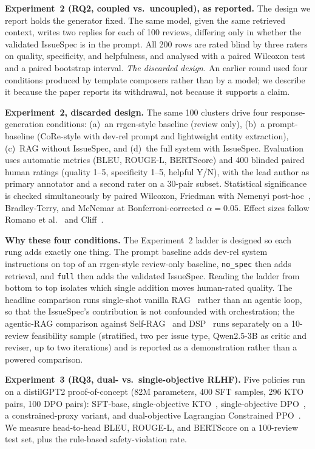 \documentclass[sigconf, anonymous]{acmart}
\begin{document}
\textbf{Experiment~2 (RQ2, coupled vs.\ uncoupled), as reported.} The design we report holds the
generator fixed. The same model, given the same retrieved context, writes two replies for each of
100 reviews, differing only in whether the validated IssueSpec is in the prompt. All 200 rows are
rated blind by three raters on quality, specificity, and helpfulness, and analysed with a paired
Wilcoxon test and a paired bootstrap interval. \emph{The discarded design.} An earlier round used
four conditions produced by template composers rather than by a model; we describe it because the
paper reports its withdrawal, not because it supports a claim.

\textbf{Experiment~2, discarded design.} The same 100 clusters drive four response-generation conditions: (a)~an rrgen-style baseline (review only), (b)~a prompt-baseline (CoRe-style with dev-rel prompt and lightweight entity extraction), (c)~RAG without IssueSpec, and (d)~the full system with IssueSpec. Evaluation uses automatic metrics (BLEU, ROUGE-L, BERTScore) and 400 blinded paired human ratings (quality 1--5, specificity 1--5, helpful Y/N), with the lead author as primary annotator and a second rater on a 30-pair subset. Statistical significance is checked simultaneously by paired Wilcoxon, Friedman with Nemenyi post-hoc~\cite{demvsar2006statistical}, Bradley-Terry, and McNemar at Bonferroni-corrected $\alpha = 0.05$. Effect sizes follow Romano et al.~\cite{romano2006appropriate} and Cliff~\cite{cliff1993dominance}.

\textbf{Why these four conditions.} The Experiment~2 ladder is designed so each rung adds
exactly one thing. The prompt baseline adds dev-rel system instructions on top of an rrgen-style
review-only baseline, \texttt{no\_spec} then adds retrieval, and \texttt{full} then adds the
validated IssueSpec. Reading the ladder from bottom to top isolates which single addition moves
human-rated quality. The headline comparison runs single-shot vanilla RAG~\cite{lewis2020retrieval}
rather than an agentic loop, so that the IssueSpec's contribution is not confounded with
orchestration; the agentic-RAG comparison against Self-RAG~\cite{asai2024self} and
DSP~\cite{khattab2022demonstrate} runs separately on a 10-review feasibility sample (stratified,
two per issue type, Qwen2.5-3B as critic and reviser, up to two iterations) and is reported as a
demonstration rather than a powered comparison.

\textbf{Experiment~3 (RQ3, dual- vs.\ single-objective RLHF).} Five policies run on a
  distilGPT2 proof-of-concept (82M parameters, 400 SFT samples, 296 KTO pairs, 100 DPO pairs):
  SFT-base, single-objective KTO~\cite{ethayarajh2024kto}, single-objective
  DPO~\cite{rafailov2023direct}, a constrained-proxy variant, and dual-objective Lagrangian
  Constrained PPO~\cite{schulman2017proximal, dai2024safe}. We measure head-to-head BLEU, ROUGE-L, and
  BERTScore on a 100-review test set, plus the rule-based safety-violation rate.
\end{document}
